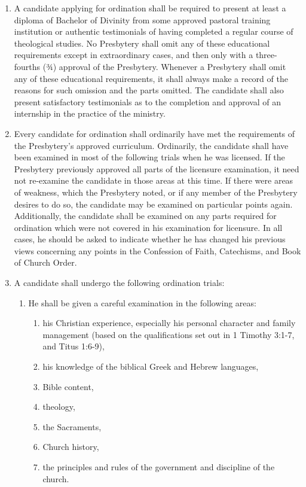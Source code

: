 \documentclass[
]{book}
\providecommand{\tightlist}{%
  \setlength{\itemsep}{0pt}\setlength{\parskip}{0pt}}
\begin{document}
\begin{enumerate}
  \begin{enumerate}
  \def\labelenumii{\alph{enumii}.}
  \item
    A candidate applying for ordination shall be required to present at least a diploma of Bachelor of Divinity from some approved pastoral training institution or authentic testimonials of having completed a regular course of theological studies. No Presbytery shall omit any of these educational requirements except in extraordinary cases, and then only with a three-fourths (¾) approval of the Presbytery. Whenever a Presbytery shall omit any of these educational requirements, it shall always make a record of the reasons for such omission and the parts omitted. The candidate shall also present satisfactory testimonials as to the completion and approval of an internship in the practice of the ministry.
  \item
    Every candidate for ordination shall ordinarily have met the requirements of the Presbytery's approved curriculum. Ordinarily, the candidate shall have been examined in most of the following trials when he was licensed. If the Presbytery previously approved all parts of the licensure examination, it need not re-examine the candidate in those areas at this time. If there were areas of weakness, which the Presbytery noted, or if any member of the Presbytery desires to do so, the candidate may be examined on particular points again. Additionally, the candidate shall be examined on any parts required for ordination which were not covered in his examination for licensure. In all cases, he should be asked to indicate whether he has changed his previous views concerning any points in the Confession of Faith, Catechisms, and Book of Church Order.
  \item
    A candidate shall undergo the following ordination trials:

    \begin{enumerate}
    \def\labelenumiii{\roman{enumiii}.}
    \tightlist
    \item
      He shall be given a careful examination in the following areas:

      \begin{enumerate}
      \def\labelenumiv{\arabic{enumiv}.}
      \item
        his Christian experience, especially his personal character and family management (based on the qualifications set out in 1 Timothy 3:1-7, and Titus 1:6-9),
      \item
        his knowledge of the biblical Greek and Hebrew languages,
      \item
        Bible content,
      \item
        theology,
      \item
        the Sacraments,
      \item
        Church history,
      \item
        the principles and rules of the government and discipline of the church.


\end{enumerate}
\end{enumerate}
\end{enumerate}
\end{enumerate}
\end{document}
